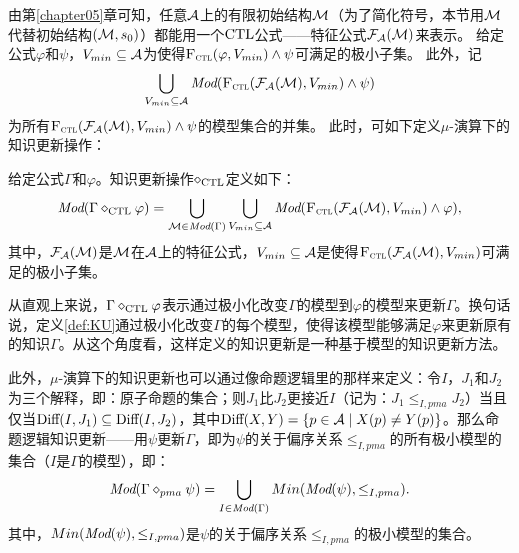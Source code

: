由第\ref{chapter05}章可知，任意${\cal A}$上的有限初始结构${\cal M}$（为了简化符号，本节用${\cal M}$代替初始结构$({\cal M},s_0)$）都能用一个$\textrm{CTL}$公式——特征公式${\cal F}_{{\cal A}}({\cal M})$来表示。%
给定公式$\varphi$和$\psi$，$V_{min}\subseteq {\cal A}$为使得${\textsc{F}_{\textsc{ctl}}}(\varphi, V_{min}) \wedge \psi$可满足的极小子集。
此外，记
$$\bigcup_{V_{min}\subseteq {\cal A}} \textit{Mod}({\textsc{F}_{\textsc{ctl}}}({\cal F}_{{\cal A}}({\cal M}), V_{min}) \wedge \psi)$$ 
为所有${\textsc{F}_{\textsc{ctl}}}({\cal F}_{{\cal A}}({\cal M}), V_{min}) \wedge \psi$的模型集合的并集。
此时，可如下定义$\mu$-演算下的知识更新操作：


\begin{definition}\label{def:KU}
	给定公式$\Gamma$和$\varphi$。知识更新操作$\diamond_{\textrm{CTL}}$定义如下：
	\[
	\textit{Mod}(\Gamma \diamond_{\textrm{CTL}} \varphi) = \bigcup_{{\cal M} \in \textit{Mod}(\Gamma)} \bigcup_{V_{min}\subseteq {\cal A}} \textit{Mod}({\textsc{F}_{\textsc{ctl}}}({\cal F}_{{\cal A}}({\cal M}), V_{min}) \wedge \varphi),
	\]
	其中，${\cal F}_{{\cal A}}({\cal M})$是${\cal M}$在${\cal A}$上的特征公式，$V_{min} \subseteq {\cal A}$是使得${\textsc{F}_{\textsc{ctl}}}({\cal F}_{{\cal A}}({\cal M}), V_{min})$可满足的极小子集。
\end{definition}

从直观上来说，$\Gamma \diamond_{\textrm{CTL}} \varphi$表示通过极小化改变$\Gamma$的模型到$\varphi$的模型来更新$\Gamma$。换句话说，定义\ref{def:KU}通过极小化改变$\Gamma$的每个模型，使得该模型能够满足$\varphi$来更新原有的知识$\Gamma$。从这个角度看，这样定义的知识更新是一种基于模型的知识更新方法。

此外，$\mu$-演算下的知识更新也可以通过像命题逻辑里的那样来定义：令$I$，$J_1$和$J_2$为三个解释，即：原子命题的集合；则$J_1$比$J_2$更接近$I$（记为：$J_1 \leq_{I,pma} J_2$）当且仅当$\textrm{Diff}(I, J_1) \subseteq \textrm{Diff}(I, J_2)$，其中$\textrm{Diff}(X, Y) =\{p\in {\cal A} \mid X(p) \not = Y(p)\}$。那么命题逻辑知识更新——用$\psi$更新$\Gamma$，即为$\psi$的关于偏序关系$\leq_{I,pma}$的所有极小模型的集合（$I$是$\Gamma$的模型），即：
$$\textit{Mod}(\Gamma \diamond_{pma} \psi) = \bigcup_{I \in \textit{Mod}(\Gamma)} Min(\textit{Mod}(\psi), \leq_{I,pma}).$$
其中，$Min(\textit{Mod}(\psi), \leq_{I,pma})$是$\psi$的关于偏序关系$\leq_{I,pma}$的极小模型的集合。

